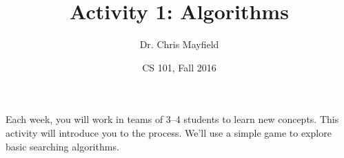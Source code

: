 \documentclass[12pt]{article}
\title{Activity 1: Algorithms}
\author{Dr. Chris Mayfield}
\date{CS 101, Fall 2016}
\begin{document}
\maketitle

Each week, you will work in teams of 3--4 students to learn new concepts.
This activity will introduce you to the process.
We'll use a simple game to explore basic searching algorithms.

%

\end{document}
